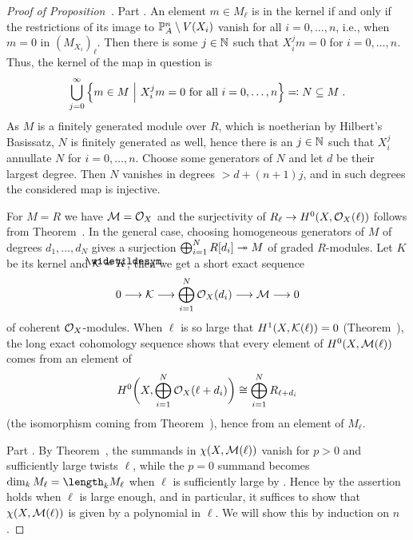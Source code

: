 \documentclass[a4paper,parskip=half,numbers=enddot, DIV=12]{scrreprt}
\begin{document}
\begin{proof}[Proof of Proposition~]
	Part . An element $m\in M_\ell$ is in the kernel if and only if the restrictions of its image to $\mathbb{P}_A^n\setminus V(X_i)$ vanish for all $i=0,\ldots,n$, i.e., when $m=0$ in $(M_{X_i})_\ell$. Then there is some $j\in\mathbb{N}$ such that $X_i^j m=0$ for $i=0,\ldots,n$. Thus, the kernel of the map in question is
	\begin{align*}
		\bigcup_{j=0}^\infty\left\{m\in M\ \middle|\  X_i^jm=0\text{ for all }i=0,\ldots,n\right\}\eqqcolon N\subseteq M\;.
	\end{align*}
	As $M$ is a finitely generated module over $R$, which is noetherian by Hilbert's Basissatz, $N$ is finitely generated as well, hence there is an $j\in\mathbb{N}$ such that $X_i^j$ annullate $N$ for $i=0,\ldots,n$. Choose some generators of $N$ and let $d$ be their largest degree. Then $N$ vanishes in degrees $>d+(n+1)j$, and in such degrees the considered map is injective.
	
	For $M=R$ we have $\mathcal{M}=\mathcal{O}_X$ and the surjectivity of $R_\ell\morphism H^0(X,\Oo_X(\ell))$ follows from Theorem~. In the general case, choosing homogeneous generators of $M$ of degrees $d_1,\ldots,d_N$ gives a surjection $\bigoplus_{i=1}^NR[d_i]\epimorphism M$ of graded $R$-modules. Let $K$ be its kernel and $\Kk=\snake{K}$, then we get a short exact sequence
	\begin{align*}
		0\morphism\Kk\morphism\bigoplus_{i=1}^N\Oo_X(d_i)\morphism \Mm\morphism 0
	\end{align*}
	of coherent $\mathcal{O}_X$-modules. When $\ell$ is so large that $H^1(X,\mathcal{K}(\ell))=0$ (Theorem~), the long exact cohomology sequence shows that every element of $H^0(X,\mathcal{M}(\ell))$ comes from an element of
	\begin{align*}
		 H^0\bigg(X,\bigoplus_{i=1}^N\mathcal{O}_X(\ell+d_i)\bigg)\cong\bigoplus_{i=1}^NR_{\ell+d_i} 
	\end{align*}
	(the isomorphism coming from Theorem~), hence from an element of $M_\ell$.
	
	Part . By Theorem~, the summands in $\chi(X,\mathcal{M}(\ell))$ vanish for $p>0$ and sufficiently large twists $\ell$, while the $p=0$ summand becomes $\dim_kM_\ell=\length_kM_\ell$ when $\ell$ is sufficiently large by . Hence by \cite[Theorem~18]{alg2} the assertion holds when $\ell$ is large enough, and in particular, it suffices to show that $\chi(X,\mathcal{M}(\ell))$ is given by a polynomial in $\ell$. We will show this by induction on $n$.
	

\end{proof}
\end{document}
